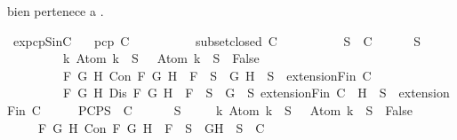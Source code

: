 \begin{isabellebody}
\begin{isamarkuptext}
\begin{itemize}
    bien  pertenece a .
  \end{itemize}%
\end{isamarkuptext}\isamarkuptrue%
\isamarkupfalse%
\ ex{}{\isacharunderscore}pcp{\isacharunderscore}SinC{\isacharcolon}\isanewline
\ \ \ {\isachardoublequoteopen}pcp\ C{\isachardoublequoteclose}\isanewline
\ \ \ \ \ \ \ \ \ \ {\isachardoublequoteopen}subset{\isacharunderscore}closed\ C{\isachardoublequoteclose}\isanewline
\ \ \ \ \ \ \ \ \ \ {\isachardoublequoteopen}S\ {\isasymin}\ C{\isachardoublequoteclose}\ \isanewline
\ \ \ {\isachardoublequoteopen}{\isasymbottom}\ {\isasymnotin}\ S\ {\isasymand}\isanewline
\ \ \ \ \ \ \ \ \ {\isacharparenleft}{\isasymforall}k{\isachardot}\ Atom\ k\ {\isasymin}\ S\ {\isasymlongrightarrow}\ \isactrlbold {\isasymnot}\ {\isacharparenleft}Atom\ k{\isacharparenright}\ {\isasymin}\ S\ {\isasymlongrightarrow}\ False{\isacharparenright}\ {\isasymand}\isanewline
\ \ \ \ \ \ \ \ \ {\isacharparenleft}{\isasymforall}F\ G\ H{\isachardot}\ Con\ F\ G\ H\ {\isasymlongrightarrow}\ F\ {\isasymin}\ S\ {\isasymlongrightarrow}\ {\isacharbraceleft}G{\isacharcomma}\ H{\isacharbraceright}\ {\isasymunion}\ S\ {\isasymin}\ {\isacharparenleft}extensionFin\ C{\isacharparenright}{\isacharparenright}\ {\isasymand}\isanewline
\ \ \ \ \ \ \ \ \ {\isacharparenleft}{\isasymforall}F\ G\ H{\isachardot}\ Dis\ F\ G\ H\ {\isasymlongrightarrow}\ F\ {\isasymin}\ S\ {\isasymlongrightarrow}\ {\isacharbraceleft}G{\isacharbraceright}\ {\isasymunion}\ S\ {\isasymin}{\isacharparenleft}extensionFin\ C{\isacharparenright}\ {\isasymor}\ {\isacharbraceleft}H{\isacharbraceright}\ {\isasymunion}\ S\ {\isasymin}\ {\isacharparenleft}extensionFin\ C{\isacharparenright}{\isacharparenright}{\isachardoublequoteclose}\isanewline
%
\isadelimproof
%
\endisadelimproof
%
\isatagproof
{}\isamarkupfalse%
\ {\isacharminus}\isanewline
\ \ \isamarkupfalse%
\ PCP{\isacharcolon}{\isachardoublequoteopen}{\isasymforall}S\ {\isasymin}\ C{\isachardot}\isanewline
\ \ \ \ {\isasymbottom}\ {\isasymnotin}\ S\isanewline
\ \ \ \ {\isasymand}\ {\isacharparenleft}{\isasymforall}k{\isachardot}\ Atom\ k\ {\isasymin}\ S\ {\isasymlongrightarrow}\ \isactrlbold {\isasymnot}\ {\isacharparenleft}Atom\ k{\isacharparenright}\ {\isasymin}\ S\ {\isasymlongrightarrow}\ False{\isacharparenright}\isanewline
\ \ \ \ {\isasymand}\ {\isacharparenleft}{\isasymforall}F\ G\ H{\isachardot}\ Con\ F\ G\ H\ {\isasymlongrightarrow}\ F\ {\isasymin}\ S\ {\isasymlongrightarrow}\ {\isacharbraceleft}G{\isacharcomma}H{\isacharbraceright}\ {\isasymunion}\ S\ {\isasymin}\ C{\isacharparenright}\isanewline

\end{isabellebody}
